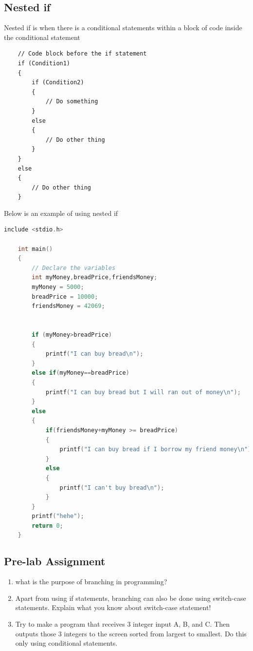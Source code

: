 \subsection{Nested if}
Nested if is when there is a conditional statements within a block of code inside the conditional statement
\begin{verbatim}
	// Code block before the if statement
	if (Condition1) 
	{
		if (Condition2)
		{
			// Do something
		}
		else
		{
			// Do other thing
		}
	} 
	else
	{
		// Do other thing
	}
\end{verbatim}

Below is an example of using nested if

\begin{lstlisting}[language=c,caption = Nested if example,label=lst:nestedifexample01]
	include <stdio.h>
	
	int main()
	{
		// Declare the variables
		int myMoney,breadPrice,friendsMoney;
		myMoney = 5000;
		breadPrice = 10000;
		friendsMoney = 42069;
		
		
		if (myMoney>breadPrice)
		{
		    printf("I can buy bread\n");
		}
		else if(myMoney==breadPrice)
		{
		    printf("I can buy bread but I will ran out of money\n");
		}
		else
		{
		    if(friendsMoney+myMoney >= breadPrice)
		    {
		        printf("I can buy bread if I borrow my friend money\n"); 
		    }
		    else
		    {
	            printf("I can't buy bread\n");	
		    }
		}
		printf("hehe");
		return 0;
	}
\end{lstlisting}


\subsection{Pre-lab Assignment}
\begin{enumerate}
	\item what is the purpose of branching in programming?
	\item Apart from using if statements, branching can also be done using switch-case statements. Explain what you know about switch-case statement!
	\item Try to make a program that receives 3 integer input A, B, and C. Then outputs those 3 integers to the screen sorted from largest to smallest. Do this only using conditional statements.
\end{enumerate}

